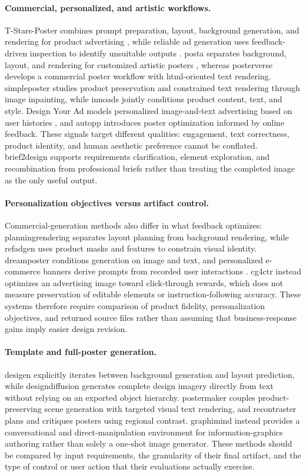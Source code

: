 \paragraph{Commercial, personalized, and artistic workflows.}
T-Stars-Poster combines prompt preparation, layout, background generation, and rendering for product advertising \citep{tstarsposter2025}, while reliable ad generation uses feedback-driven inspection to identify unsuitable outputs \citep{reliablead2024}.
\ac{posta} separates background, layout, and rendering for customized artistic posters \citep{posta2025}, whereas \ac{posterverse} develops a commercial poster workflow with \ac{html}-oriented text rendering.
\ac{simpleposter} studies product preservation and constrained text rendering through image inpainting, while \ac{innoads} jointly conditions product content, text, and style.
Design Your Ad models personalized image-and-text advertising based on user histories \citep{designyourad2026}, and \ac{autopp} introduces poster optimization informed by online feedback.
These signals target different qualities: engagement, text correctness, product identity, and human aesthetic preference cannot be conflated.
\ac{brief2design} supports requirements clarification, element exploration, and recombination from professional briefs rather than treating the completed image as the only useful output.

\paragraph{Personalization objectives versus artifact control.}
Commercial-generation methods also differ in what feedback optimizes: \ac{planningrendering} separates layout planning from background rendering, while \ac{refadgen} uses product masks and features to constrain visual identity.
\ac{dreamposter} conditions generation on image and text, and personalized e-commerce banners derive prompts from recorded user interactions \citep{ecommercebanners2024}.
\ac{cg4ctr} instead optimizes an advertising image toward click-through rewards, which does not measure preservation of editable elements or instruction-following accuracy.
These systems therefore require comparison of product fidelity, personalization objectives, and returned source files rather than assuming that business-response gains imply easier design revision.

\paragraph{Template and full-poster generation.}
\ac{desigen} explicitly iterates between background generation and layout prediction, while \ac{designdiffusion} generates complete design imagery directly from text without relying on an exported object hierarchy.
\ac{postermaker} couples product-preserving scene generation with targeted visual text rendering, and \ac{recontraster} plans and critiques posters using regional contrast.
\ac{graphimind} instead provides a conversational and direct-manipulation environment for information-graphics authoring rather than solely a one-shot image generator.
These methods should be compared by input requirements, the granularity of their final artifact, and the type of control or user action that their evaluations actually exercise.
